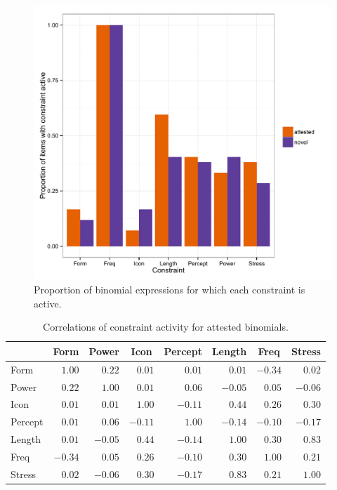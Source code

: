 \documentclass[authoryear]{elsarticle}
\begin{document}
\begin{figure}[t]
\includegraphics[scale=0.8]{constraint-activity-bar-graph.pdf}
\caption{Proportion of binomial expressions for which each constraint is active.} \label{fig:constraint-activity}
\end{figure}
\begin{table}[!tbp]
\begin{center}
\begin{tabular}{lrrrrrrr}
\hline\hline
\multicolumn{1}{l}{}&\multicolumn{1}{c}{Form}&\multicolumn{1}{c}{Power}&\multicolumn{1}{c}{Icon}&\multicolumn{1}{c}{Percept}&\multicolumn{1}{c}{Length}&\multicolumn{1}{c}{Freq}&\multicolumn{1}{c}{Stress}\tabularnewline
\hline
Form&$ 1.00$&$ 0.22$&$ 0.01$&$ 0.01$&$ 0.01$&$-0.34$&$ 0.02$\tabularnewline
Power&$ 0.22$&$ 1.00$&$ 0.01$&$ 0.06$&$-0.05$&$ 0.05$&$-0.06$\tabularnewline
Icon&$ 0.01$&$ 0.01$&$ 1.00$&$-0.11$&$ 0.44$&$ 0.26$&$ 0.30$\tabularnewline
Percept&$ 0.01$&$ 0.06$&$-0.11$&$ 1.00$&$-0.14$&$-0.10$&$-0.17$\tabularnewline
Length&$ 0.01$&$-0.05$&$ 0.44$&$-0.14$&$ 1.00$&$ 0.30$&$ 0.83$\tabularnewline
Freq&$-0.34$&$ 0.05$&$ 0.26$&$-0.10$&$ 0.30$&$ 1.00$&$ 0.21$\tabularnewline
Stress&$ 0.02$&$-0.06$&$ 0.30$&$-0.17$&$ 0.83$&$ 0.21$&$ 1.00$\tabularnewline
\hline
\end{tabular}
\end{center}
\caption{Correlations of constraint activity for attested binomials.} \label{t:constraint-cor-a}
\end{table}
\end{document}
